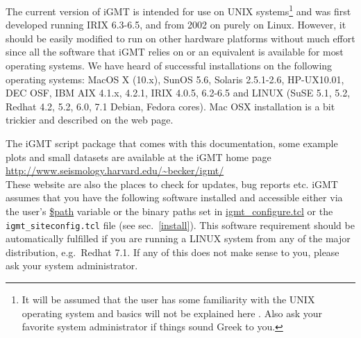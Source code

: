 \documentclass[11pt]{article}
\begin{document}
The current version of iGMT is intended for use on UNIX
systems\footnote{ It will be assumed that the user has some
  familiarity with the UNIX operating system and basics will not be
  explained here \cite[for UNIX and shell scripting reference see,
  e.g.,][]{gilly94}. Also ask your favorite system administrator if
  things sound Greek to you.}  and was first developed running IRIX
6.3-6.5, and from 2002 on purely on Linux.  However, it should be
easily modified to run on other hardware platforms without much effort
since all the software that iGMT relies on or an equivalent is
available for most operating systems.  We have heard of successful
installations on the following operating systems: MacOS X (10.x),
SunOS 5.6, Solaris 2.5.1-2.6, HP-UX10.01, DEC OSF, IBM AIX 4.1.x,
4.2.1, IRIX 4.0.5, 6.2-6.5 and LINUX (SuSE 5.1, 5.2, Redhat 4.2, 5.2,
6.0, 7.1 Debian, Fedora cores). Mac OSX installation is a bit trickier
and described on the web page.


The iGMT script package that comes with this documentation, some
example plots and small datasets are available at the iGMT home page\\

\url{http://www.seismology.harvard.edu/~becker/igmt/}\\


These website are also the places to check for updates, bug reports
etc. iGMT assumes that you have the following software installed and
accessible either via the user's \url{$path} variable or the binary
paths set in \url{igmt_configure.tcl} or the {\tt
igmt\_siteconfig.tcl} file (see sec.~\ref{install}). This software
requirement should be automatically fulfilled if you are running a
LINUX system from any of the major distribution, e.g.\ Redhat 7.1. If
any of this does not make sense to you, please ask your system
administrator.
\end{document}
